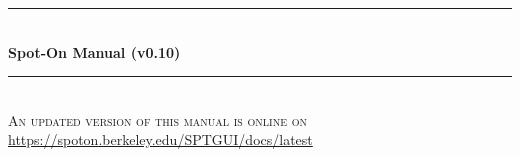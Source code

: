 \begin{titlepage}

\newcommand{\HRule}{\rule{\linewidth}{0.5mm}} %

\center %
 


\HRule \\[0.4cm]
       { \huge \bfseries Spot-On Manual (v0.10)
       }\\[0.4cm] %
\HRule \\[1cm]

\textsc{\large An updated version of this manual is online on}\\[0.1cm] %
\large \url{https://spoton.berkeley.edu/SPTGUI/docs/latest}\\[0.4cm]





\end{titlepage}

